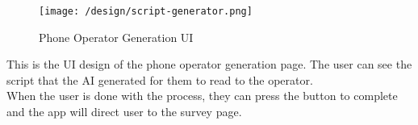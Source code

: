 \begin{figure}[h]
    \centering
    \texttt{[image: /design/script-generator.png]}
    \caption{Phone Operator Generation UI}
\end{figure}
This is the UI design of the phone operator generation page. The user can see the script that the AI generated for them to read to the operator. \\
\indent When the user is done with the process, they can press the button to complete and the app will direct user to the survey page.